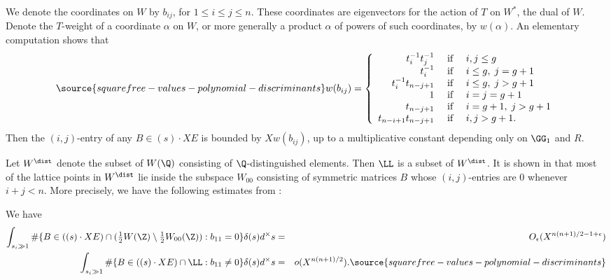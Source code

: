 We denote the coordinates on $W$ by $b_{ij}$, for $1\leq i\leq j\leq
n$. These coordinates are eigenvectors for the action of $T$ on $W^*$,
the dual of $W$. Denote the $T$-weight of a coordinate $\alpha$ on
$W$, or more generally a product $\alpha$ of powers of such
coordinates, by $w(\alpha)$. An elementary computation shows that
\begin{equation}\label{wbij}
\source{squarefree-values-polynomial-discriminants}
w(b_{ij})=\left\{
\begin{array}{rcl}
t_i^{-1}t_j^{-1} &\mbox{ if }& i,j\leq g\\
t_i^{-1} &\mbox{ if }& i\leq g,\;j=g+1\\
t_i^{-1}t_{n-j+1} &\mbox{ if }& i\leq g,\; j>g+1\\
1 &\mbox{ if }& i=j=g+1\\
t_{n-j+1} &\mbox{ if }& i=g+1,\;j>g+1\\
t_{n-i+1}t_{n-j+1} &\mbox{ if }& i,j>g+1.
\end{array}
\right.
\end{equation}
Then the $(i,j)$-entry of any $B\in (s)\cdot XE$ is bounded by
$Xw(b_{ij})$, up to a multiplicative constant depending only on $\GG_1$
and $R$.

Let $W^\dist$ denote the subset of $W(\Q)$ consisting of
$\Q$-distinguished elements. Then $\LL$ is a subset of $W^\dist$. It
is shown in \cite[\S10.2]{BG2} that most of the lattice points in
$W^\dist$ lie inside the subspace $W_{00}$ consisting of symmetric
matrices $B$ whose $(i,j)$-entries are 0 whenever $i+j<n$. More
precisely, we have the following estimates from \cite[Propositions~10.5 and 10.7]{BG2}:

\begin{proposition}
\notready\label{prop:bg2}
We have
\begin{eqnarray}
  \int_{s_i\gg 1} \#\{B\in((s)\cdot XE)\cap({\textstyle\frac12} W(\Z)\setminus{\textstyle\frac12} W_{00}(\Z)):b_{11}=0\}\delta(s)d^\times s &=& O_\epsilon(X^{n(n+1)/2-1+\epsilon}) \\
  \label{eq:selbergpre}\int_{s_i\gg 1} \#\{B\in((s)\cdot XE)\cap\LL:b_{11}\neq 0\}\delta(s)d^\times s &=& o(X^{n(n+1)/2}).
\source{squarefree-values-polynomial-discriminants}
\end{eqnarray}
\end{proposition}

